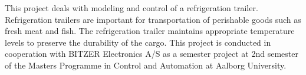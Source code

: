 This project deals with modeling and control of a refrigeration trailer. Refrigeration trailers are important for transportation of perishable goods such as fresh meat and fish. The refrigeration trailer maintains appropriate temperature levels to preserve the durability of the cargo. 
This project is conducted in cooperation with BITZER Electronics A/S as a semester project at 2nd semester of the Masters Programme in Control and Automation at Aalborg University.